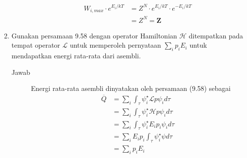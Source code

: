\documentclass[a4paper , 12 pt]{article}
\begin{document}
\begin{enumerate}
\begin{description}
 			\begin{align}
 			W_{i,max} \cdot e^{E_i/kT}& = Z^N \cdot e^{E_i/kT} \cdot  e^{-E_i/kT} \nonumber \\
 			& = Z^N = \boldsymbol{Z} \tag{QED}
 			\end{align} 
		\end{description}
	\item Gunakan persamaan 9.58 dengan operator Hamiltonian $ \mathcal{H}$ ditempatkan pada tempat operator $\mathcal{L}$ untuk memperoleh pernyataan $\displaystyle \sum_{i} p_i E_i  $ untuk mendapatkan energi rata-rata dari asembli.
	\begin{description}
		\item[Jawab] 
		Energi rata-rata asembli dinyatakan oleh persamaan (9.58) sebagai
		\begin{align}
		\overline{Q} & = \sum_i \int_\tau \psi_i^\star   \mathcal{L} p \psi_i d \tau \nonumber \\
		& = \sum_i \int_\tau \psi_i^\star \mathcal{H} p \psi_i d \tau \nonumber  \\
		& = \sum_i \int_\tau \psi_i^\star E_i p_i \psi_i  d \tau  \nonumber \\
		& = \sum_i E_i p_i \int_\tau  \psi_i^\star \psi d \tau \nonumber  \\
		& = \sum_i p_i E_i \tag{QED}
		\end{align}
	\end{description}
\end{enumerate}
\end{document}
